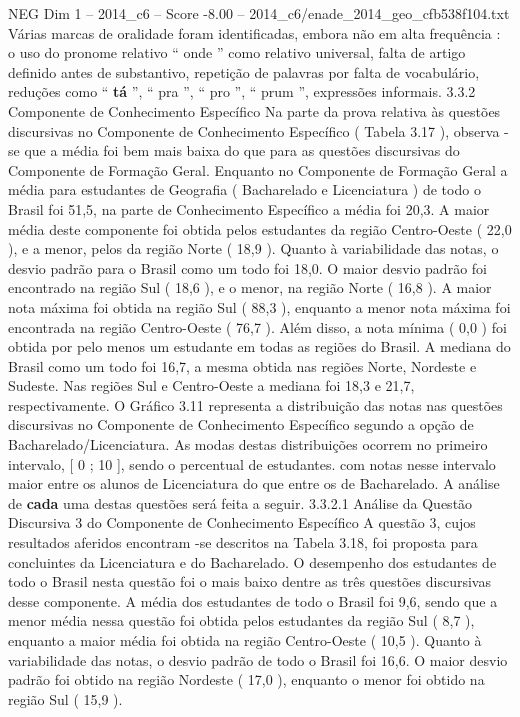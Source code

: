 \begin{textsample}{NEG Dim 1 – 2014\_c6 – Score -8.00 – 2014\_c6/enade\_2014\_geo\_cfb538f104.txt}
Várias marcas de oralidade foram identificadas, embora não em alta frequência : o uso do pronome relativo “ onde ” como relativo universal, falta de artigo definido antes de substantivo, repetição de palavras por falta de vocabulário, reduções como “ \textbf{tá} ”, “ pra ”, “ pro ”, “ prum ”, expressões informais. 3.3.2 Componente de Conhecimento Específico Na parte da prova relativa às questões discursivas no Componente de Conhecimento Específico ( Tabela 3.17 ), observa -se que a média foi bem mais baixa do que para as questões discursivas do Componente de Formação Geral.
Enquanto no Componente de Formação Geral a média para estudantes de Geografia ( Bacharelado e Licenciatura ) de todo o Brasil foi 51,5, na parte de Conhecimento Específico a média foi 20,3.
A maior média deste componente foi obtida pelos estudantes da região Centro-Oeste ( 22,0 ), e a menor, pelos da região Norte ( 18,9 ).
Quanto à variabilidade das notas, o desvio padrão para o Brasil como um todo foi 18,0.
O maior desvio padrão foi encontrado na região Sul ( 18,6 ), e o menor, na região Norte ( 16,8 ).
A maior nota máxima foi obtida na região Sul ( 88,3 ), enquanto a menor nota máxima foi encontrada na região Centro-Oeste ( 76,7 ).
Além disso, a nota mínima ( 0,0 ) foi obtida por pelo menos um estudante em todas as regiões do Brasil.
A mediana do Brasil como um todo foi 16,7, a mesma obtida nas regiões Norte, Nordeste e Sudeste.
Nas regiões Sul e Centro-Oeste a mediana foi 18,3 e 21,7, respectivamente.
O Gráfico 3.11 representa a distribuição das notas nas questões discursivas no Componente de Conhecimento Específico segundo a opção de Bacharelado/Licenciatura.
As modas destas distribuições ocorrem no primeiro intervalo, [ 0 ; 10 ], sendo o percentual de estudantes. com notas nesse intervalo maior entre os alunos de Licenciatura do que entre os de Bacharelado.
A análise de \textbf{cada} uma destas questões será feita a seguir. 3.3.2.1 Análise da Questão Discursiva 3 do Componente de Conhecimento Específico A questão 3, cujos resultados aferidos encontram -se descritos na Tabela 3.18, foi proposta para concluintes da Licenciatura e do Bacharelado.
O desempenho dos estudantes de todo o Brasil nesta questão foi o mais baixo dentre as três questões discursivas desse componente.
A média dos estudantes de todo o Brasil foi 9,6, sendo que a menor média nessa questão foi obtida pelos estudantes da região Sul ( 8,7 ), enquanto a maior média foi obtida na região Centro-Oeste ( 10,5 ).
Quanto à variabilidade das notas, o desvio padrão de todo o Brasil foi 16,6.
O maior desvio padrão foi obtido na região Nordeste ( 17,0 ), enquanto o menor foi obtido na região Sul ( 15,9 ).

\end{textsample}
